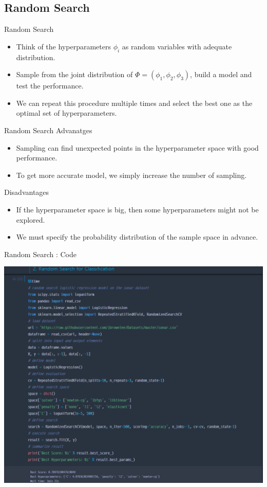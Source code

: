 \documentclass{beamer}
\begin{document}
\subsection{Random Search}

%
\begin{frame}{Random Search}
\begin{itemize}
\item
Think of the hyperparameters \(\phi_i\) as random variables with adequate distribution.
\item
Sample from the joint distribution of \(\Phi=(\phi_1,\phi_2,\phi_3)\), build a model and test the performance.
\item
We can repeat this procedure multiple times and select the best one as the optimal set of hyperparameters.
\end{itemize}
\end{frame}

%
\begin{frame}{Random Search}
Advanatges
\begin{itemize}
\item
Sampling can find unexpected points in the hyperparameter space with good performance.
\item
To get more accurate model, we simply increase the number of sampling.
\end{itemize}
Disadvantages
\begin{itemize}
\item
If the hyperparameter space is big, then some hyperparameters might not be explored.
\item
We must specify the probability distribution of the sample space in advance.
\end{itemize}
\end{frame}

%
\begin{frame}{Random Search : Code}
\begin{center}
\includegraphics[width=.75\textwidth]{2_3_random_search}
\end{center}
\end{frame}
\end{document}
